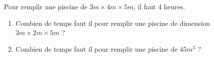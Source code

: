 
Pour remplir une piscine de $3m \times 4 m \times 5m$, il faut 4 heures.

\begin{enumerate}
\item Combien de temps faut il pour remplir une piscine de dimension $3m \times 2 m \times 5m$ ?
\item Combien de temps faut il pour remplir une piscine de $45 m^3$ ?
\end{enumerate}